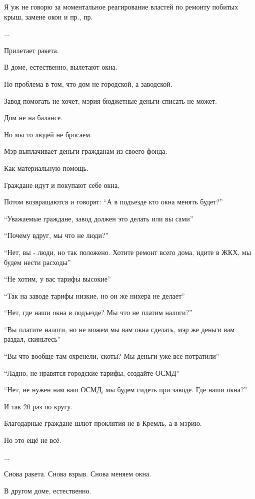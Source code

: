 Я уж не говорю за моментальное реагирование властей по ремонту побитых крыш, замене окон и пр., пр.\par
...\par
Прилетает ракета.\par
В доме, естественно, вылетают окна.\par
Но проблема в том, что дом не городской, а заводской. \par
Завод помогать не хочет, мэрия бюджетные деньги списать не может. \par
Дом не на балансе.\par
Но мы то людей не бросаем.\par
Мэр выплачивает деньги гражданам из своего фонда. \par
Как материальную помощь.\par
Граждане идут и покупают себе окна.\par
Потом возвращаются и говорят: \enquote{А в подъезде кто окна менять будет?}\par
\enquote{Уважаемые граждане, завод должен это делать или вы сами}\par
\enquote{Почему вдруг, мы что не люди?}\par
\enquote{Нет, вы - люди, но так положено. Хотите ремонт всего дома, идите в ЖКХ, мы будем нести расходы}\par
\enquote{Не хотим, у вас тарифы высокие}\par
\enquote{Так на заводе тарифы низкие, но он же нихера не делает}\par
\enquote{Нет, где наши окна в подъезде? Мы что не платим налоги?}\par
\enquote{Вы платите налоги, но не можем мы вам окна сделать, мэр же деньги вам раздал, скиньтесь}\par
\enquote{Вы что вообще там охренели, скоты? Мы деньги уже все потратили}\par
\enquote{Ладно, не нравятся городские тарифы, создайте ОСМД}\par
\enquote{Нет, не нужен нам ваш ОСМД, мы будем сидеть при заводе. Где наши окна?}\par
И так 20 раз по кругу.\par
Благодарные граждане шлют проклятия не в Кремль, а в мэрию.\par
Но это ещё не всё.\par
...\par
Снова ракета. Снова взрыв. Снова меняем окна.\par
В другом доме, естественно.\par

